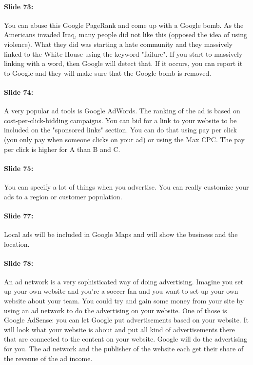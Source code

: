 \documentclass[10pt,a4paper]{report}
\begin{document}
\paragraph{Slide 73:}You can abuse this Google PageRank and come up with a Google bomb. As the Americans invaded Iraq, many people did not like this (opposed the idea of using violence). What they did was starting a hate community and they massively linked to the White House using the keyword "failure". If you start to massively linking with a word, then Google will detect that. If it occurs, you can report it to Google and they will make sure that the Google bomb is removed.

\paragraph{Slide 74:}A very popular ad tools is Google AdWords. The ranking of the ad is based on cost-per-click-bidding campaigns. You can bid for a link to your website to be included on the "sponsored links" section. You can do that using pay per click (you only pay when someone clicks on your ad) or using the Max CPC.
The pay per click is higher for A than B and C.

\paragraph{Slide 75:}You can specify a lot of things when you advertise. You can really customize your ads to a region or customer population.

\paragraph{Slide 77:}Local ads will be included in Google Maps and will show the business and the location.

\paragraph{Slide 78:}An ad network is a very sophisticated way of doing advertising. Imagine you set up your own website and you're a soccer fan and you want to set up your own website about your team. You could try and gain some money from your site by using an ad network to do the advertising on your website. One of those is Google AdSense: you can let Google put advertisements based on your website. It will look what your website is about and put all kind of advertisements there that are connected to the content on your website. Google will do the advertising for you. The ad network and the publisher of the website each get their share of the revenue of the ad income.
\end{document}
